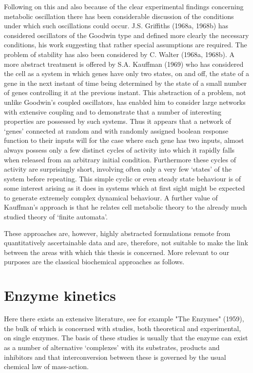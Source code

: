 Following on this and also because of the clear experimental findings concerning metabolic oscillation there has been considerable discussion of the conditions under which such oscillations could occur. J.S. Griffiths (1968a, 1968b) has considered oscillators of the Goodwin type and defined more clearly the necessary conditions, his work suggesting that rather special assumptions are required. The problem of stability has also been considered by C. Walter (1968a, 1968b). A more abstract treatment is offered by S.A. Kauffman (1969) who has considered the cell as a system in which genes have only two states, on and off, the state of a gene in the next instant of time being determined by the state of a small number of genes controlling it at the previous instant. This abstraction of a problem, not unlike Goodwin's coupled oscillators, has enabled him to consider large networks with extensive coupling and to demonstrate that a number of interesting properties are possessed by such systems. Thus it appears that a network of `genes' connected at random and with randomly assigned boolean response function to their inputs will for the case where each gene has two inputs, almost always possess only a few distinct cycles of activity into which it rapidly falls when released from an arbitrary initial condition. Furthermore these cycles of activity are surprisingly short, involving often only a very few `states' of the system before repeating. This simple cyclic or even steady state behaviour is of some interest arising as it does in systems which at first sight might be expected to generate extremely complex dynamical behaviour. A further value of Kauffman's approach is that he relates cell metabolic theory to the already much studied theory of `finite automata'.

These approaches are, however, highly abstracted formulations remote from quantitatively ascertainable data and are, therefore, not suitable to make the link between the areas with which this thesis is concerned. More relevant to our purposes are the classical biochemical approaches as follows.

\section{Enzyme kinetics}

Here there exists an extensive literature, see for example "The Enzymes" (1959), the bulk of which is concerned with studies, both theoretical and experimental, on single enzymes. The basis of these studies is usually that the enzyme can exist as a number of alternative `complexes' with its substrates, products and inhibitors and that interconversion between these is governed by the usual chemical law of mass-action.

